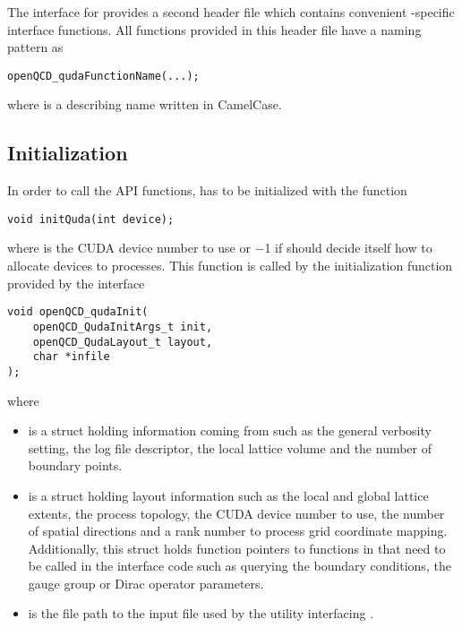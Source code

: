 The interface for \openqxd provides a second header file  which contains convenient \openqxd-specific interface functions.
All functions provided in this header file have a naming pattern as
\begin{verbatim}
openQCD_qudaFunctionName(...);
\end{verbatim}
where  is a describing name written in CamelCase.

\subsection{Initialization}
\label{sec:interface:quda:init}

In order to call the API functions, \quda has to be initialized with the function
\begin{verbatim}
void initQuda(int device);
\end{verbatim}
where  is the CUDA device number to use or \num{-1} if \quda should decide itself how to allocate devices to processes. This function is called by the initialization function provided by the interface
\begin{verbatim}
void openQCD_qudaInit(
    openQCD_QudaInitArgs_t init,
    openQCD_QudaLayout_t layout,
    char *infile
);
\end{verbatim}
where
\begin{itemize}
  \item {} is a struct holding information coming from \openqxd such as the general verbosity setting, the log file descriptor, the local lattice volume and the number of boundary points.
  \item {} is a struct holding layout information such as the local and global lattice extents, the process topology, the CUDA device number to use, the number of spatial \Cstar directions and a rank number to process grid coordinate mapping. Additionally, this struct holds function pointers to functions in \openqxd that need to be called in the interface code such as querying the boundary conditions, the gauge group or Dirac operator parameters.
  \item {} is the file path to the input file used by the utility interfacing \quda.
\end{itemize}

